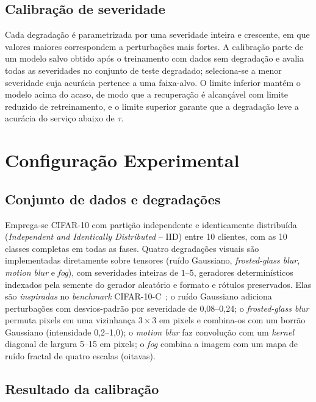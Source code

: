 \documentclass[conference]{IEEEtran}
\begin{document}
\subsection{Calibração de severidade}\label{sec:calibracao}
Cada degradação é parametrizada por uma severidade inteira e crescente, em que valores maiores correspondem a perturbações mais fortes. A calibração parte de um modelo salvo obtido após o treinamento com dados sem degradação e avalia todas as severidades no conjunto de teste degradado; seleciona-se a menor severidade cuja acurácia pertence a uma faixa-alvo. O limite inferior mantém o modelo acima do acaso, de modo que a recuperação é alcançável com limite reduzido de retreinamento, e o limite superior garante que a degradação leve a acurácia do serviço abaixo de $\tau$.

\section{Configuração Experimental}\label{sec:setup}
\subsection{Conjunto de dados e degradações}
Emprega-se CIFAR-10 com partição independente e identicamente distribuída (\textit{Independent and Identically Distributed} -- IID) entre 10 clientes, com as 10 classes completas em todas as fases. Quatro degradações visuais são implementadas diretamente sobre tensores (ruído Gaussiano, \textit{frosted-glass blur}, \textit{motion blur} e \textit{fog}), com severidades inteiras de $1$--$5$, geradores determinísticos indexados pela semente do gerador aleatório e formato e rótulos preservados. Elas são \emph{inspiradas} no \textit{benchmark} CIFAR-10-C~\cite{hendrycks2019}; o ruído Gaussiano adiciona perturbações com desvios-padrão por severidade de 0,08--0,24; o \textit{frosted-glass blur} permuta pixels em uma vizinhança $3\times3$ em pixels e combina-os com um borrão Gaussiano (intensidade 0,2--1,0); o \textit{motion blur} faz convolução com um \textit{kernel} diagonal de largura 5--15 em pixels; o \textit{fog} combina a imagem com um mapa de ruído fractal de quatro escalas (oitavas).
\subsection{Resultado da calibração}
\end{document}
